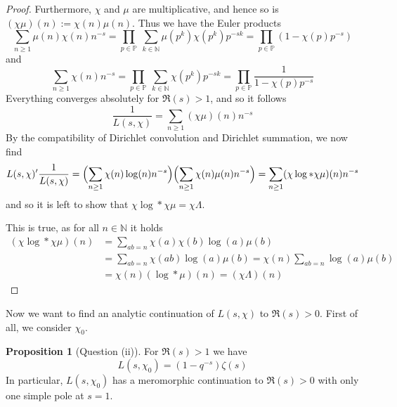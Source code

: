 \documentclass{scrartcl}
\newcommand{\primes}{\mathbb{P}}
\newcommand{\N}{\mathbb{N}}
\theoremstyle{definition}
\newtheorem{proposition}[definition]{Proposition}
\begin{document}
\begin{proof}
    Furthermore, $\chi$ and $\mu$ are multiplicative, and hence so is $(\chi\mu)(n) := \chi(n)\mu(n)$.
    Thus we have the Euler products
    \begin{equation*}
        \sum_{n \geq 1} \mu(n) \chi(n) n^{-s} = \prod_{p \in \primes} \ \sum_{k \in \N} \mu(p^k) \chi(p^k) p^{-sk} = \prod_{p \in \primes} (1 - \chi(p)p^{-s})
    \end{equation*}
    and
    \begin{equation*}
        \sum_{n \geq 1} \chi(n) n^{-s} = \prod_{p \in \primes} \ \sum_{k \in \N} \chi(p^k) p^{-sk} = \prod_{p \in \primes} \frac 1 {1 - \chi(p)p^{-s}}
    \end{equation*}
    Everything converges absolutely for $\Re(s) > 1$, and so it follows
    \begin{equation*}
        \frac 1 {L(s, \chi)} = \sum_{n \geq 1} (\chi\mu)(n) n^{-s}
    \end{equation*}
    By the compatibility of Dirichlet convolution and Dirichlet summation, we now find
    \begin{equation*}
        L(s, \chi)' \frac 1 {L(s, \chi)} = \Bigl( \sum_{n \geq 1} \chi(n) \log(n) n^{-s} \Bigr) \Bigl( \sum_{n \geq 1} \chi(n) \mu(n) n^{-s} \Bigr) = \sum_{n \geq 1} (\chi\log * \chi\mu)(n) n^{-s}
    \end{equation*}
    and so it is left to show that $\chi\log * \chi\mu = \chi\Lambda$.

    This is true, as for all $n \in \N$ it holds
    \begin{align*}
        (\chi\log * \chi\mu)(n) &= \sum_{ab = n} \chi(a)\chi(b) \log(a)\mu(b) \\
        &= \sum_{ab = n} \chi(ab) \log(a)\mu(b) = \chi(n) \sum_{ab = n} \log(a) \mu(b) \\
        &= \chi(n) (\log * \mu)(n) = (\chi\Lambda)(n)
    \end{align*}
\end{proof}
Now we want to find an analytic continuation of $L(s, \chi)$ to $\Re(s) > 0$.
First of all, we consider $\chi_0$.
\begin{proposition}[Question (ii)]
    \label{prop:formula_trivial_L_series}
    For $\Re(s) > 1$ we have
    \begin{equation*}
        L(s, \chi_0) = (1 - q^{-s}) \zeta(s)
    \end{equation*}
    In particular, $L(s, \chi_0)$ has a meromorphic continuation to $\Re(s) > 0$ with only one simple pole at $s = 1$.
\end{proposition}
\end{document}
